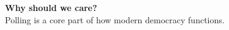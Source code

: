 \documentclass[aspectratio=169]{beamer}
\theoremstyle{principle}
\begin{document}
\begin{frame}

\begin{center}
\Huge\textbf{Why should we care?}\\
\bigskip
\bigskip
\large Polling is a core part of how modern democracy functions.\\
\end{center}

\end{frame}
\end{document}
